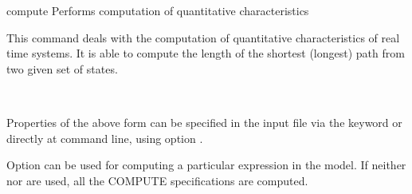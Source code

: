 \begin{nusmvCommand}{compute} {Performs computation of quantitative characteristics}


This command deals with the computation of quantitative
characteristics of real time systems. It is able to compute the length
of the shortest (longest) path from two given set of states.
\begin{center}
 \\
\end{center}
Properties of the above form can be specified in the input file via
the keyword  or directly at command line, using option
.

Option  can be used for computing a particular
expression in the model. If neither  nor 
are used, all the COMPUTE specifications are computed.

\begin{cmdOpt}





\end{cmdOpt}
\end{nusmvCommand}
